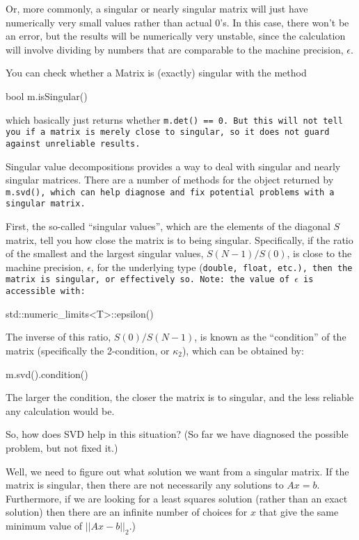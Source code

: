 Or, more commonly, a singular or nearly singular matrix
will just have numerically very small values rather than actual 0's.  In this 
case, there won't be an error, but the results will be numerically
very unstable, since the calculation will involve dividing by numbers
that are comparable to the machine precision, $\epsilon$.

You can check whether a Matrix is (exactly) singular with 
the method
\begin{tmvcode}
bool m.isSingular()
\end{tmvcode}
which basically just returns whether \tt{m.det() == 0}.  But this will not
tell you if a matrix is merely close to singular, so it does not guard 
against unreliable results.

Singular value decompositions provides a way to deal with 
singular and nearly singular matrices.  There are a number of methods for the 
object returned by \tt{m.svd()}, which can help diagnose and fix 
potential problems with a singular matrix.

First, the so-called ``singular values'', which are the elements of the
diagonal $S$ matrix, tell you how close the matrix is to being singular.
Specifically, if the ratio of the smallest and the largest singular values,
$S(N-1)/S(0)$, is close to the machine precision, $\epsilon$, for the 
underlying type (\tt{double}, \tt{float}, etc.),
then the matrix is singular, or effectively so.
Note: the value of $\epsilon$ is accessible with:
\begin{tmvcode}
std::numeric_limits<T>::epsilon()
\end{tmvcode}

The inverse of this ratio, $S(0)/S(N-1)$, is known as the ``condition'' of the matrix
(specifically the 2-condition, or $\kappa_2$), which can be obtained by:
\begin{tmvcode}
m.svd().condition()
\end{tmvcode}
The larger the condition, the closer the matrix is to singular, and the
less reliable any calculation would be.

So, how does SVD help in this situation?  (So far we have diagnosed
the possible problem, but not fixed it.)

Well, we need to figure out what solution we want from a singular matrix.
If the matrix is singular, then there are not necessarily any solutions
to $A x = b$.  Furthermore, if we are looking for a least squares solution 
(rather than an exact solution) then there are an infinite number of choices for 
$x$ that give the same minimum value of $||A x-b||_2$.)

